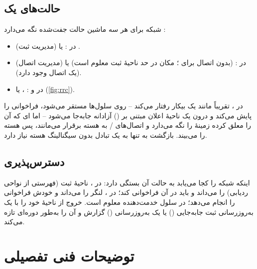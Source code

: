 \documentclass[11pt,a4paper]{article}
\begin{document}
\subsection{حالت‌های یک }
شبکه برای هر  سه ماشین حالت جفت‌شده نگه می‌دارد \cite{ts23501,ts38331}:
\begin{itemize}
  \item \textbf{} (مدیریت ثبت) در :  یا .
  \item \textbf{} (مدیریت اتصال) در :  (بدون اتصال  برای ؛ مکان در حد ناحیهٔ ثبت معلوم است) یا
         (یک اتصال  وجود دارد).
  \item \textbf{} در  و : ،  یا  (\cref{fig:rrc}).
\end{itemize}
در ،  تقریباً مانند یک  بیکار رفتار می‌کند -- روی سلول‌ها مستقر می‌شود، فراخوانی را پایش می‌کند و درون یک ناحیهٔ
اعلان مبتنی بر  () آزادانه جابه‌جا می‌شود -- اما ای که آن را معلق کرده زمینهٔ  را نگه می‌دارد و اتصال‌های
/ به هسته برقرار می‌مانند، پس هسته  را  می‌بیند. بازگشت به  تنها به یک تبادل
 بدون سیگنالینگ هسته نیاز دارد.

\begin{acnfigure}
  \caption{حالت‌ها و گذارهای  در ؛  در هسته به  تعلق دارد.}
  \label{fig:rrc}
\end{acnfigure}

\subsection{دسترس‌پذیری}
اینکه شبکه  را کجا می‌یابد به حالت آن بستگی دارد: در ،  ناحیهٔ ثبت (فهرستی از نواحی ردیابی) را می‌داند و باید در آن
فراخوانی کند؛ در ،  لنگر  را می‌داند و خودش فراخوانی  را انجام می‌دهد؛ در  سلول
خدمت‌دهنده معلوم است.  خروج از ناحیهٔ خود را با یک به‌روزرسانی ثبت جابه‌جایی () یا یک به‌روزرسانی 
() گزارش و آن را به‌طور دوره‌ای تازه می‌کند.

\section{توضیحات فنی تفصیلی}
\end{document}

